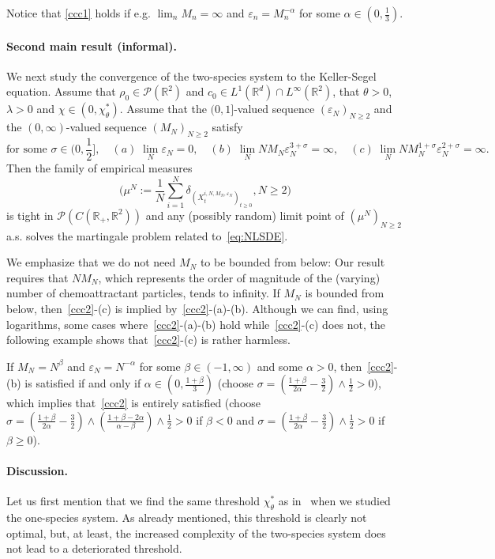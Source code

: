 \documentclass[11pt]{article}
\newcommand{\R}{\mathbb{R}}
\newcommand{\1}{\mathbbm{1}}
\newcommand{\Pp}{\mathcal P}
\newcommand{\e}{\varepsilon}
\newcommand{\vip}{\vskip5pt}
\begin{document}
\vip
Notice that \eqref{ccc1} holds if e.g. $\lim_n M_n=\infty$ and $\e_n=M_n^{-\alpha}$ for some 
$\alpha\in (0,\frac 13)$.


\paragraph{Second main result (informal).}
We next study the convergence of the two-species system to the Keller-Segel equation.
Assume that $\rho_0 \in \Pp(\R^2)$ and $c_0 \in L^1(\R^d)\cap L^\infty(\R^2)$,
that $\theta>0$, $\lambda>0$ and $\chi \in (0,\chi^*_\theta)$. Assume that
the $(0,1]$-valued sequence $(\e_N)_{N\geq 2}$ and the $(0,\infty)$-valued sequence $(M_N)_{N\geq 2}$ satisfy
\begin{equation}\label{ccc2}
\text{for some $\sigma\in \Big(0,\frac12\Big]$},\quad
(a)\; \lim_N \e_N=0, \quad (b)\; \lim_N NM_N\e_N^{3+\sigma}=\infty, \quad
(c) \;\lim_N NM_N^{1+\sigma}\e_N^{2+\sigma}=\infty.
\end{equation}
Then the family of empirical measures 
$$
\Big(\mu^N:=\frac1N\sum_{i=1}^N \delta_{(X^{i,N,M_N,\e_N}_t)_{t\geq 0}} , N\geq 2\Big)
$$ 
is tight in 
$\Pp(C(\R_+,\R^2))$ and any (possibly random) limit point
of $(\mu^N)_{N\geq 2}$ a.s. solves the martingale problem related to~\eqref{eq:NLSDE}.

\vip
We emphasize that we do not need $M_N$ to be bounded from below: Our result requires that $NM_N$, which represents the order of magnitude of the (varying) number of chemoattractant particles, tends to infinity. If $M_N$ is bounded from below, then~\eqref{ccc2}-(c) is implied by~\eqref{ccc2}-(a)-(b). 
Although we can find, using logarithms, some cases where~\eqref{ccc2}-(a)-(b) hold while~\eqref{ccc2}-(c) does not, the following example shows
that~\eqref{ccc2}-(c) is rather harmless.
\vip

If $M_N=N^\beta$ and $\e_N=N^{-\alpha}$ for some $\beta \in (-1,\infty)$ and some $\alpha>0$, then~\eqref{ccc2}-(b) is satisfied if and only if $\alpha \in (0,\frac{1+\beta}3)$ (choose $\sigma=(\frac{1+\beta}{2\alpha}-\frac 32)\land\frac12>0$), which implies that~\eqref{ccc2} is entirely satisfied
(choose $\sigma=(\frac{1+\beta}{2\alpha}-\frac 32)\land(\frac{1+\beta-2\alpha}{\alpha-\beta})\land\frac12>0$ if $\beta<0$
and $\sigma=(\frac{1+\beta}{2\alpha}-\frac 32)\land\frac12>0$ if $\beta\geq 0$).


\paragraph{Discussion.}
Let us first mention that we find the same threshold $\chi_\theta^*$ as in~\cite{FT1} when we studied the one-species system. As already mentioned, this threshold is clearly not optimal, but, at least, the increased complexity of the two-species system does not lead to a deteriorated threshold.
\end{document}
